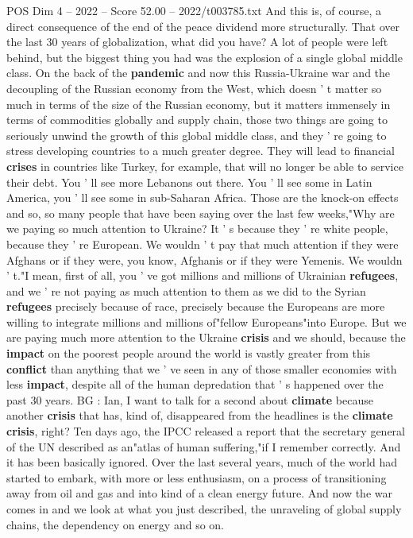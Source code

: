 \begin{textsample}{POS Dim 4 – 2022 – Score 52.00 – 2022/t003785.txt}
And this is, of course, a direct consequence of the end of the peace dividend more structurally.
That over the last 30 years of globalization, what did you have?
A lot of people were left behind, but the biggest thing you had was the explosion of a single global middle class.
On the back of the \textbf{pandemic} and now this Russia-Ukraine war and the decoupling of the Russian economy from the West, which doesn ' t matter so much in terms of the size of the Russian economy, but it matters immensely in terms of commodities globally and supply chain, those two things are going to seriously unwind the growth of this global middle class, and they ' re going to stress developing countries to a much greater degree.
They will lead to financial \textbf{crises} in countries like Turkey, for example, that will no longer be able to service their debt.
You ' ll see more Lebanons out there.
You ' ll see some in Latin America, you ' ll see some in sub-Saharan Africa.
Those are the knock-on effects and so, so many people that have been saying over the last few weeks,"Why are we paying so much attention to Ukraine?
It ' s because they ' re white people, because they ' re European.
We wouldn ' t pay that much attention if they were Afghans or if they were, you know, Afghanis or if they were Yemenis.
We wouldn ' t."I mean, first of all, you ' ve got millions and millions of Ukrainian \textbf{refugees}, and we ' re not paying as much attention to them as we did to the Syrian \textbf{refugees} precisely because of race, precisely because the Europeans are more willing to integrate millions and millions of"fellow Europeans"into Europe.
But we are paying much more attention to the Ukraine \textbf{crisis} and we should, because the \textbf{impact} on the poorest people around the world is vastly greater from this \textbf{conflict} than anything that we ' ve seen in any of those smaller economies with less \textbf{impact}, despite all of the human depredation that ' s happened over the past 30 years.
BG : Ian, I want to talk for a second about \textbf{climate} because another \textbf{crisis} that has, kind of, disappeared from the headlines is the \textbf{climate} \textbf{crisis}, right?
Ten days ago, the IPCC released a report that the secretary general of the UN described as an"atlas of human suffering,"if I remember correctly.
And it has been basically ignored.
Over the last several years, much of the world had started to embark, with more or less enthusiasm, on a process of transitioning away from oil and gas and into kind of a clean energy future.
And now the war comes in and we look at what you just described, the unraveling of global supply chains, the dependency on energy and so on.

\end{textsample}
